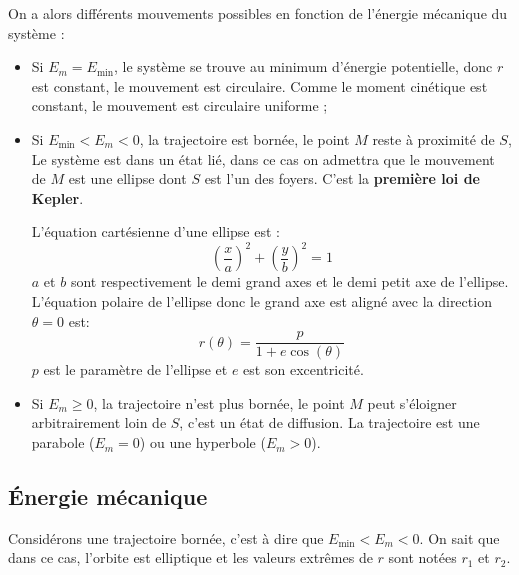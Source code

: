 \documentclass{cours}
\begin{document}
On a alors différents mouvements possibles en fonction de l'énergie mécanique du système :
\begin{itemize}
  \item Si $E_m = E_\text{min}$, le système se trouve au minimum d'énergie potentielle, donc $r$ est constant, le mouvement est circulaire. Comme le moment cinétique est constant, le mouvement est circulaire uniforme ;
  \item Si $E_\text{min}<E_m<0$, la trajectoire est bornée, le point $M$ reste à proximité de $S$, Le système est dans un état lié, dans ce cas on admettra que le mouvement de $M$ est une ellipse dont $S$ est l'un des foyers. C'est la \textbf{première loi de Kepler}. 
  
  L'équation cartésienne d'une ellipse est :
  \begin{equation}
    \left(\frac{x}{a}\right)^2 + \left( \frac{y}{b} \right)^2 = 1  
  \end{equation}
  $a$ et $b$ sont respectivement le demi grand axes et le demi petit axe de l'ellipse. L'équation polaire de l'ellipse donc le grand axe est aligné avec la direction $\theta=0$ est:
  \begin{equation}
    r(\theta) = \frac{p}{1+e\cos(\theta)}
  \end{equation}
  $p$ est le paramètre de l'ellipse et $e$ est son excentricité.
  \item Si $E_m\geq0$, la trajectoire n'est plus bornée, le point $M$ peut s'éloigner arbitrairement loin de $S$, c'est un état de diffusion. La trajectoire est une parabole ($E_m=0$) ou une hyperbole ($E_m>0$).  
\end{itemize}

\subsection{Énergie mécanique}%
\label{sub:energie_mecanique}
Considérons une trajectoire bornée, c'est à dire que $E_\text{min}<E_m<0$. On sait que dans ce cas, l'orbite est elliptique et les valeurs extrêmes de $r$ sont notées $r_1$ et $r_2$. 
\end{document}
